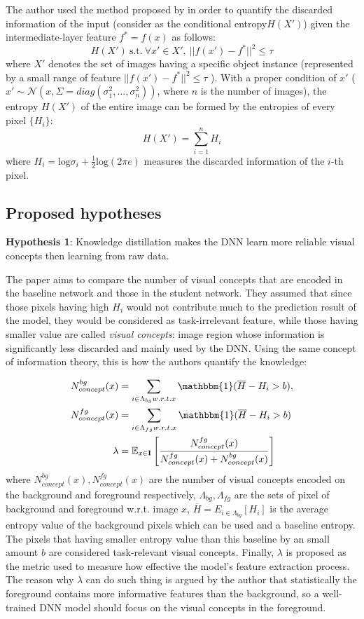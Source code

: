 The author used the method proposed by \cite{quantifying} in order to quantify the discarded information of the input (consider as the conditional entropy$H(X')$) given the intermediate-layer feature $f^{*} = f(x)$ as follows:
  \[
      H(X')\ \text{s.t.}\ \forall x' \in X',\ ||f(x')-f^{*}||^2 \le \tau
  \]
where $X'$ denotes the set of images having a specific object instance (represented by a small range of feature $||f(x')-f^{*}||^2 \le \tau$ ). With a proper condition of $x'$ ($x' \sim \mathcal{N}(x, \Sigma=diag(\sigma_1^2,...,\sigma_n^2))$, where $n$ is the number of images), the entropy $H(X')$ of the entire image can be formed by the entropies of every pixel $\{H_i\}$:
  \[
      H(X') = \displaystyle\sum_{i=1}^nH_i
  \]
where $H_i = \text{log} \sigma_i + \frac{1}{2}\text{log}(2\pi e)$ measures the discarded information of the $i$-th pixel.

\subsection{Proposed hypotheses}
\textbf{Hypothesis 1}: Knowledge distillation makes the DNN learn more reliable visual concepts then learning from raw data.

The paper aims to compare the number of visual concepts that are encoded in the baseline network and those in the student network. They assumed that since those pixels having high $H_i$ would not contribute much to the prediction result of the model, they would be considered as task-irrelevant feature, while those having smaller value are called \textit{visual concepts}: image region whose information is significantly less discarded and mainly used by the DNN. Using the same concept of information theory, this is how the authors quantify the knowledge:

\begin{align*}
  N_{concept}^{bg}(x) &= \sum_{i \in \Lambda_{bg} w.r.t. x} \mathbbm{1} (\overline{H} - H_i > b), \\
  N_{concept}^{fg}(x) &= \sum_{i \in \Lambda_{fg} w.r.t. x} \mathbbm{1} (\overline{H} - H_i > b) \\
  \lambda &= \mathbb{E}_{x \in \textbf{I}} \left[\frac{N_{concept}^{fg}(x)}{N_{concept}^{fg}(x) + N_{concept}^{bg}(x)}\right]
\end{align*}
where $N_{concept}^{bg}(x), N_{concept}^{fg}(x)$ are the number of visual concepts encoded on the background and foreground respectively, $\Lambda_{bg}, \Lambda_{fg}$ are the sets of pixel of background and foreground w.r.t. image $x$, $\overline{H} = E_{i\in \Lambda_{bg}}[H_i]$ is the average entropy value of the background pixels which can be used and a baseline entropy. The pixels that having smaller entropy value than this baseline by an small amount $b$ are considered task-relevant visual concepts. Finally, $\lambda$ is proposed as the metric used to measure how effective the model's feature extraction process. The reason why $\lambda$ can do such thing is argued by the author that statistically the foreground contains more informative features than the background, so a well-trained DNN model should focus on the visual concepts in the foreground.


